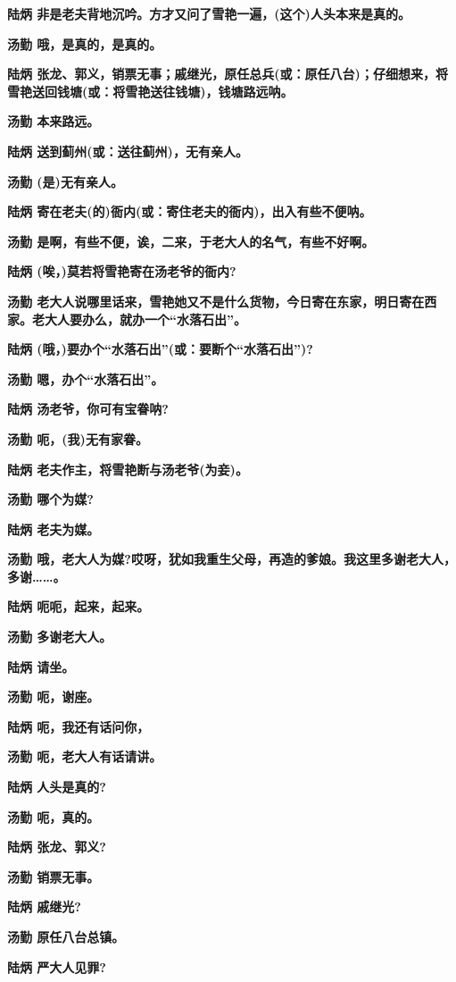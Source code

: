 \textbf{陆炳
非是老夫背地沉吟。方才又问了雪艳一遍，(这个)人头本来是真的。}

\textbf{汤勤 哦，是真的，是真的。}

\textbf{陆炳
张龙、郭义，销票无事；戚继光，原任总兵(或：原任八台)；仔细想来，将雪艳送回钱塘(或：将雪艳送往钱塘)，钱塘路远呐。}

\textbf{汤勤 本来路远。}

\textbf{陆炳 送到蓟州(或：送往蓟州)，无有亲人。}

\textbf{汤勤 (是)无有亲人。}

\textbf{陆炳 寄在老夫(的)衙内(或：寄住老夫的衙内)，出入有些不便呐。}

\textbf{汤勤 是啊，有些不便，诶，二来，于老大人的名气，有些不好啊。}

\textbf{陆炳 (唉，)莫若将雪艳寄在汤老爷的衙内?}

\textbf{汤勤
老大人说哪里话来，雪艳她又不是什么货物，今日寄在东家，明日寄在西家。老大人要办么，就办一个``水落石出''。}

\textbf{陆炳 (哦，)要办个``水落石出''(或：要断个``水落石出'')?}

\textbf{汤勤 嗯，办个``水落石出''。}

\textbf{陆炳 汤老爷，你可有宝眷呐?}

\textbf{汤勤 呃，(我)无有家眷。}

\textbf{陆炳 老夫作主，将雪艳断与汤老爷(为妾)。}

\textbf{汤勤 哪个为媒?}

\textbf{陆炳 老夫为媒。}

\textbf{汤勤
哦，老大人为媒?哎呀，犹如我重生父母，再造的爹娘。我这里多谢老大人，多谢\ldots{}\ldots{}。}

\textbf{陆炳 呃呃，起来，起来。}

\textbf{汤勤 多谢老大人。}

\textbf{陆炳 请坐。}

\textbf{汤勤 呃，谢座。}

\textbf{陆炳 呃，我还有话问你，}

\textbf{汤勤 呃，老大人有话请讲。}

\textbf{陆炳 人头是真的?}

\textbf{汤勤 呃，真的。}

\textbf{陆炳 张龙、郭义?}

\textbf{汤勤 销票无事。}

\textbf{陆炳 戚继光?}

\textbf{汤勤 原任八台总镇。}

\textbf{陆炳 严大人见罪?}

